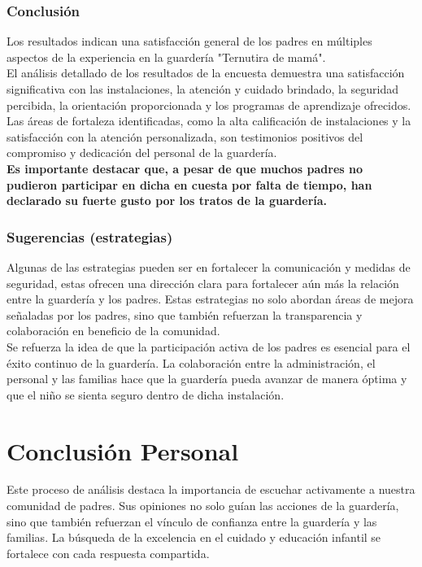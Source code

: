 \documentclass[letterpaper,12pt]{article}
\begin{document}
\begin{sloppypar}
\subsubsection{Conclusión} 
Los resultados indican una satisfacción general de los padres en múltiples aspectos de la experiencia en la guardería "Ternutira de mamá".
\vspace{0.3cm}\\ 
El análisis detallado de los resultados de la encuesta demuestra una satisfacción significativa con las instalaciones, la atención y cuidado brindado, la seguridad percibida, la orientación proporcionada y los programas de aprendizaje ofrecidos.
\vspace{0.3cm}\\ 
Las áreas de fortaleza identificadas, como la alta calificación de instalaciones y la satisfacción con la atención personalizada, son testimonios positivos del compromiso y dedicación del personal de la guardería.
\vspace{0.3cm}\\ 
\textbf{Es importante destacar que, a pesar de que muchos padres no pudieron participar en dicha en cuesta por falta de tiempo, han declarado su fuerte gusto por los tratos de la guardería. }

\subsubsection{Sugerencias (estrategias)}
Algunas de las estrategias pueden ser en fortalecer la comunicación y medidas de seguridad, estas ofrecen una dirección clara para fortalecer aún más la relación entre la guardería y los padres. Estas estrategias no solo abordan áreas de mejora señaladas por los padres, sino que también refuerzan la transparencia y colaboración en beneficio de la comunidad.
\vspace{0.3cm}\\ 
Se refuerza la idea de que la participación activa de los padres es esencial para el éxito continuo de la guardería. La colaboración entre la administración, el personal y las familias hace que la guardería pueda avanzar de manera óptima y que el niño se sienta seguro dentro de dicha instalación.

\section{Conclusión Personal}
Este proceso de análisis destaca la importancia de escuchar activamente a nuestra comunidad de padres. Sus opiniones no solo guían las acciones de la guardería, sino que también refuerzan el vínculo de confianza entre la guardería y las familias. La búsqueda de la excelencia en el cuidado y educación infantil se fortalece con cada respuesta compartida.


\end{sloppypar}
\end{document}
